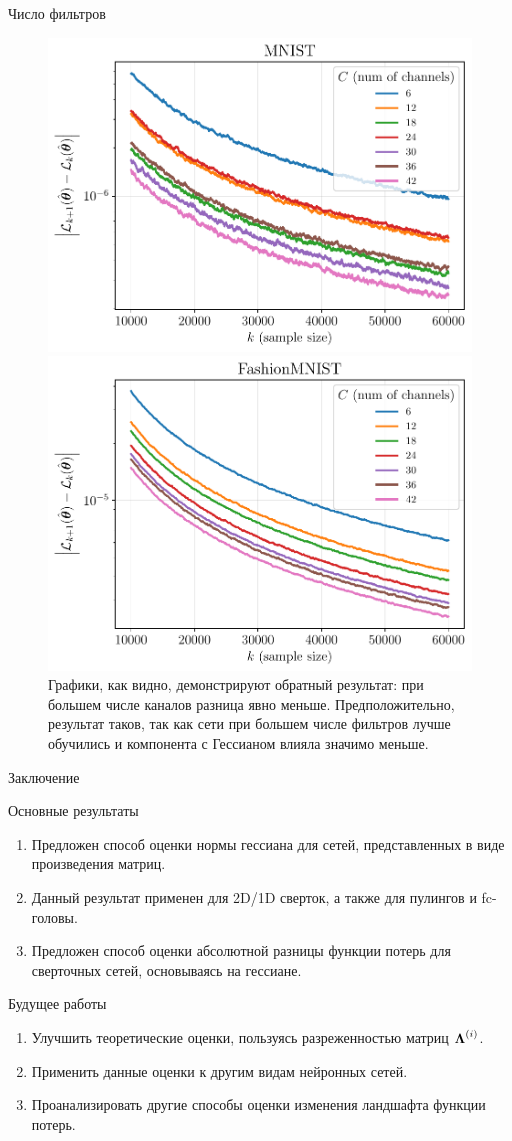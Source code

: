 \documentclass[aspectratio=169]{beamer}
\begin{document}
\begin{frame}{Число фильтров}
    \begin{figure}[ht]
        \centering
        \includegraphics[width=0.5\linewidth]{../isp/figs/mnist_change_channels.pdf}\hfill
        \includegraphics[width=0.5\linewidth]{../isp/figs/fashion_mnist_change_channels.pdf}
        Графики, как видно, демонстрируют обратный результат: при большем числе каналов разница явно меньше. Предположительно, результат таков, так как сети при большем числе фильтров лучше обучились и компонента с Гессианом влияла значимо меньше.
    \end{figure}
\end{frame}

\begin{frame}{Заключение}
    \begin{block}{Основные результаты}
    \begin{enumerate}
        \item Предложен способ оценки нормы гессиана для сетей, представленных в виде произведения матриц.
        \item Данный результат применен для 2D/1D сверток, а также для пулингов и fc-головы.
        \item Предложен способ оценки абсолютной разницы функции потерь для сверточных сетей, основываясь на гессиане.
    \end{enumerate}
    \end{block}
    \vspace{-0.5em}
    
    \begin{block}{Будущее работы}
    \vspace{-0.5em}
    \begin{enumerate}
        \item Улучшить теоретические оценки, пользуясь разреженностью матриц $\boldsymbol{\Lambda}^{(i)}$.
        \item Применить данные оценки к другим видам нейронных сетей.
        \item Проанализировать другие способы оценки изменения ландшафта функции потерь.
    \end{enumerate}
    \end{block}
    \vspace{0.5em}
\end{frame}
\end{document}
